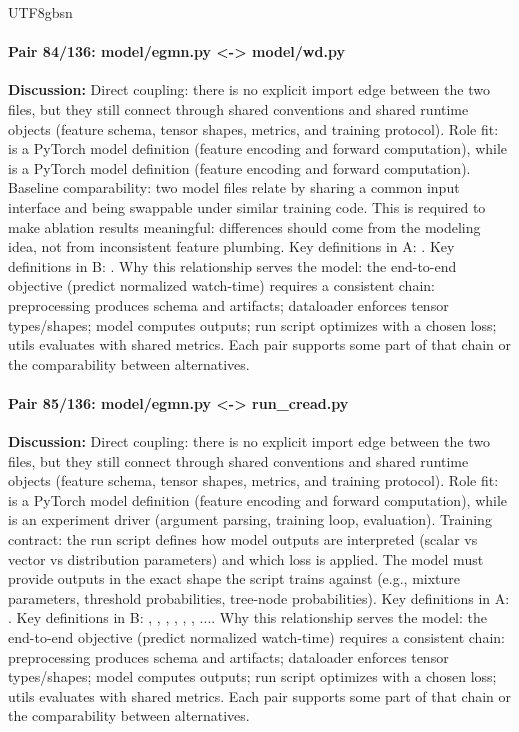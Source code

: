 \documentclass[11pt]{article}
\begin{document}
\begin{CJK*}{UTF8}{gbsn}
\paragraph{Pair 84/136: model/egmn.py <-> model/wd.py}
\textbf{Discussion:} Direct coupling: there is no explicit import edge between the two files, but they still connect through shared conventions and shared runtime objects (feature schema, tensor shapes, metrics, and training protocol). Role fit: \texttt{} is a PyTorch model definition (feature encoding and forward computation), while \texttt{} is a PyTorch model definition (feature encoding and forward computation). Baseline comparability: two model files relate by sharing a common input interface and being swappable under similar training code. This is required to make ablation results meaningful: differences should come from the modeling idea, not from inconsistent feature plumbing. Key definitions in A: \texttt{}. Key definitions in B: \texttt{}. Why this relationship serves the model: the end-to-end objective (predict normalized watch-time) requires a consistent chain: preprocessing produces schema and artifacts; dataloader enforces tensor types/shapes; model computes outputs; run script optimizes with a chosen loss; utils evaluates with shared metrics. Each pair supports some part of that chain or the comparability between alternatives.

\paragraph{Pair 85/136: model/egmn.py <-> run\_cread.py}
\textbf{Discussion:} Direct coupling: there is no explicit import edge between the two files, but they still connect through shared conventions and shared runtime objects (feature schema, tensor shapes, metrics, and training protocol). Role fit: \texttt{} is a PyTorch model definition (feature encoding and forward computation), while \texttt{} is an experiment driver (argument parsing, training loop, evaluation). Training contract: the run script defines how model outputs are interpreted (scalar vs vector vs distribution parameters) and which loss is applied. The model must provide outputs in the exact shape the script trains against (e.g., mixture parameters, threshold probabilities, tree-node probabilities). Key definitions in A: \texttt{}. Key definitions in B: \texttt{}, \texttt{}, \texttt{}, \texttt{}, \texttt{}, \texttt{}, .... Why this relationship serves the model: the end-to-end objective (predict normalized watch-time) requires a consistent chain: preprocessing produces schema and artifacts; dataloader enforces tensor types/shapes; model computes outputs; run script optimizes with a chosen loss; utils evaluates with shared metrics. Each pair supports some part of that chain or the comparability between alternatives.


\end{CJK*}
\end{document}

